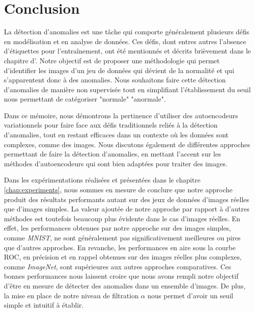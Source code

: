 \chapter*{Conclusion}           %
\label{chap:conclusion}         %

La détection d'anomalies est une tâche qui comporte généralement plusieurs défis en modélisation et en analyse de données. Ces défis, dont entres autres l'absence d'étiquettes pour l'entraînement, ont été mentionnés et décrits brièvement dans le chapitre d'. Notre objectif est de proposer une méthodologie qui permet d'identifier les images d'un jeu de données qui dévient de la normalité et qui s'apparentent donc à des anomalies. Nous souhaitons faire cette détection d'anomalies de manière non supervisée tout en simplifiant l'établissement du seuil nous permettant de catégoriser \DIFdelbegin {}\DIFdelend \DIFaddbegin {}\DIFaddend "normale" \DIFdelbegin {}\DIFdelend \DIFaddbegin {}\DIFaddend "anormale". 

Dans ce mémoire, nous démontrons la pertinence d'utiliser des autoencodeurs variationnels pour faire face aux défis traditionnels reliés à la détection d'anomalies, tout en restant efficaces dans un contexte où les données sont complexes, comme des images. Nous discutons également de différentes approches permettant de faire la détection d'anomalies, en mettant l'accent sur les méthodes d'autoencodeurs qui sont bien adaptées pour traiter des images.

Dans les expérimentations réalisées et présentées dans le chapitre \ref{chap:experiments}, nous sommes en mesure de conclure que notre approche produit des résultats performants autant sur des jeux de données d'images réelles que d'images simples. La valeur ajoutée de notre approche par rapport à d'autres méthodes est toutefois beaucoup plus évidente dans le cas d'images réelles. En effet, les performances obtenues par notre approche sur des images simples, comme \textit{MNIST}, ne sont généralement pas significativement meilleures ou pires que d'autres approches. En revanche, les performances en aire sous la courbe ROC, en précision et en rappel obtenues sur des images réelles plus complexes, comme \textit{ImageNet}, sont supérieures aux autres approches comparatives. Ces bonnes performances nous laissent croire que nous avons rempli notre objectif d'être en mesure de détecter des anomalies dans un ensemble d'images. De plus, la mise en place de notre niveau de filtration $\alpha$ nous permet d'avoir un seuil simple et intuitif à établir.



